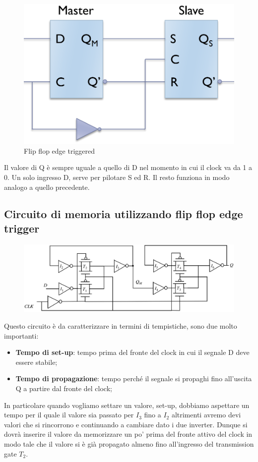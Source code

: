 \begin{figure}[htbp]
    \centering
    \includegraphics[width=0.5\linewidth]{img/edge_trigg.png}
    \caption{Flip flop edge triggered}
\end{figure}

Il valore di Q è sempre uguale a quello di D nel momento in cui il clock va da 1 a 0. Un solo ingresso D, serve per pilotare S ed R. Il resto funziona in modo analogo a quello precedente.

\newpage
\subsection{Circuito di memoria utilizzando flip flop edge trigger}


\begin{figure}[htbp]
    \centering
    \includegraphics[width=0.65\linewidth]{img/circuito_edge_trigger.png}
\end{figure}

Questo circuito è da caratterizzare in termini di tempistiche, sono due molto importanti:

\begin{itemize}
    \item \textbf{Tempo di set-up}: tempo prima del fronte del clock in cui il segnale D deve essere stabile;
    \item \textbf{Tempo di propagazione}: tempo perché il segnale si propaghi fino all'uscita Q a partire dal fronte del clock;
\end{itemize}

In particolare quando vogliamo settare un valore, set-up, dobbiamo aspettare un tempo per il quale il valore sia passato per $I_3$ fino a $I_2$ altrimenti avremo devi valori che si rincorrono e continuando a cambiare dato i due inverter. Dunque si dovrà inserire il valore da memorizzare un po' prima del fronte attivo del clock in modo tale che il valore si è già propagato almeno fino all'ingresso del transmission gate $T_2$.


